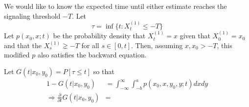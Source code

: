 \documentclass{article}
\begin{document}
We would like to know the expected time until either estimate reaches the signaling threshold $-T$.  Let 
\begin{equation}
\tau=\inf\{t:X_t^{(1)}\leq -T\} \label{stopping}
\end{equation}
Let $p(x_0,x;t)$ be the probability density that $X_t^{(1)}=x$ given that $X_0^{(1)}=x_0$ and that the $X_s^{(1)}\gneq -T$ for all $s\in[0,t]$.  Then, assuming $x,x_0>-T$, this modified $p$ also satisfies the backward equation.

Let $G(t|x_0,y_0)=P[\tau\leq t]$ so that 
\begin{align*}
1-G(t|x_0,y_0)&=\int_{-\infty}^\infty\int_{-b}^ap(x_0,x,y_0,y;t)dxdy
\\ \Rightarrow \frac{\partial}{\partial t}G(t|x_0,y_0)&=
\end{align*}
\end{document}
